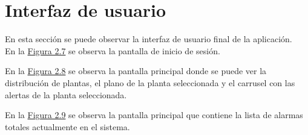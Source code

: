 

\section{Interfaz de usuario}
\label{section-ui}

En esta sección se puede observar la interfaz de usuario final de la aplicación.\\

En la \hyperref[fig:login]{Figura 2.7} se observa la pantalla de inicio de sesión.

En la \hyperref[fig:map]{Figura 2.8}  se observa la pantalla principal donde se puede ver la distribución de plantas, el plano de la planta seleccionada y el carrusel con las alertas de la planta seleccionada.

En la \hyperref[fig:list]{Figura 2.9}  se observa la pantalla principal que contiene la lista de alarmas totales actualmente en el sistema.

\newpage

